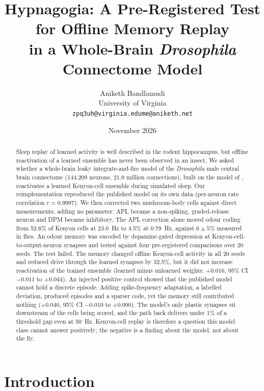 \documentclass[11pt]{article}
\title{%
  Hypnagogia: A Pre-Registered Test for Offline Memory Replay \\
  in a Whole-Brain \emph{Drosophila} Connectome Model
}
\author{
  Aniketh Bandlamudi \\
  \small University of Virginia \\
  \small\texttt{zpq3uh@virginia.edu}\quad\texttt{me@aniketh.net}
}
\date{November 2026}
\newcommand{\Dm}{\emph{Drosophila}}
\begin{document}
\maketitle

\begin{abstract}
\noindent Sleep replay of learned activity is well described in the rodent hippocampus, but offline reactivation of a learned ensemble has never been observed in an insect. We asked whether a whole-brain leaky integrate-and-fire model of the \Dm{} male central brain connectome (144,209 neurons, 21.9 million connections), built on the model of \citet{shiu2024}, reactivates a learned Kenyon-cell ensemble during simulated sleep. Our reimplementation reproduced the published model on its own data (per-neuron rate correlation $r = 0.9997$). We then corrected two mushroom-body cells against direct measurements, adding no parameter: APL became a non-spiking, graded-release neuron and DPM became inhibitory. The APL correction alone moved odour coding from 52.6\% of Kenyon cells at 23.0~Hz to 4.5\% at 0.79~Hz, against $6 \pm 5\%$ measured in flies. An odour memory was encoded by dopamine-gated depression at Kenyon-cell-to-output-neuron synapses and tested against four pre-registered comparisons over 20 seeds. The test failed. The memory changed offline Kenyon-cell activity in all 20 seeds and reduced drive through the learned synapses by 32.5\%, but it did not increase reactivation of the trained ensemble (learned minus unlearned weights: $+0.016$, 95\% CI $-0.011$ to $+0.044$). An injected positive control showed that the published model cannot hold a discrete episode. Adding spike-frequency adaptation, a labelled deviation, produced episodes and a sparser code, yet the memory still contributed nothing ($+0.040$, 95\% CI $-0.010$ to $+0.090$). The model's only plastic synapses sit downstream of the cells being scored, and the path back delivers under 1\% of a threshold gap even at 50~Hz. Kenyon-cell replay is therefore a question this model class cannot answer positively; the negative is a finding about the model, not about the fly.

\end{abstract}

\tableofcontents
\newpage

\section{Introduction}
\end{document}
